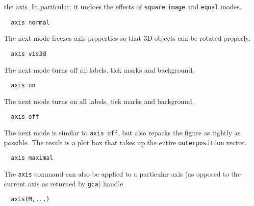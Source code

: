 the axis.  In particular, it undoes the effects of \verb|square|
\verb|image| and \verb|equal| modes.
\begin{verbatim}
  axis normal
\end{verbatim}
The next mode freezes axis properties so that 3D objects can
be rotated properly.
\begin{verbatim}
  axis vis3d
\end{verbatim}
The next mode turns off all labels, tick marks and background.
\begin{verbatim}
  axis on
\end{verbatim}
The next mode turns on all labels, tick marks and background.
\begin{verbatim}
  axis off
\end{verbatim}
The next mode is similar to \verb|axis off|, but also repacks the
figure as tightly as possible.  The result is a plot box that
takes up the entire \verb|outerposition| vector.
\begin{verbatim}
  axis maximal
\end{verbatim}
The \verb|axis| command can also be applied to a particular axis
(as opposed to the current axis as returned by \verb|gca|) handle
\begin{verbatim}
  axis(M,...)
\end{verbatim}
